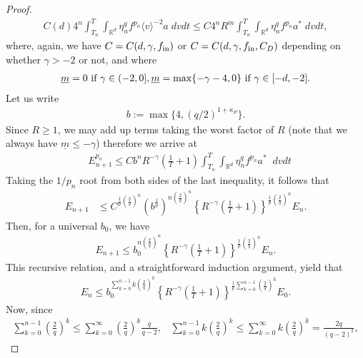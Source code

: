 \documentclass[12pt,american]{amsart}
\numberwithin{equation}{section}
\theoremstyle{plain}
\theoremstyle{definition}                  %
\def\astar{{a^*}}
\def\fin{f_{\textnormal{in}}}
\begin{document}
\begin{proof}
\begin{align*}
    C(d)4^n\int_{T_n}^T\int_{\mathbb{R}^d}\eta_n^q f^{p_n}\langle v\rangle^{-2}a\;dvdt \leq C4^n R^{\underline{m}} \int_{T_n}^T\int_{\mathbb{R}^d}\eta_n^q f^{p_n}\astar \;dvdt,
  \end{align*}
  where, again, we have $C=C(d,\gamma,\fin)$ or $C=C(d,\gamma,\fin,C_D)$ depending on whether $\gamma>-2$ or not, and where 
  \begin{align*}
    \underline{m} = 0 \textnormal{ if } \gamma\in (-2,0], \underline{m} = \max\{-\gamma-4,0\} \textnormal{ if } \gamma\in [-d,-2].	  
  \end{align*}	  
  Let us write
  \begin{align*}
    b := \max\{4,(q/2)^{1+\kappa_P}\}.
  \end{align*}	  
   Since $R\geq 1$, we may add up terms taking the worst factor of $R$ (note that we always have $\underline{m}\leq -\gamma$) therefore we arrive at
  \begin{align*}	
    & E_{n+1}^{p_{n}} \leq Cb^nR^{-\gamma }\left( \frac{1}{T}+1 \right)\int_{T_n}^{T}\int_{\mathbb{R}^d} \eta_n^q f^{p_n} \astar \;\;dvdt
  \end{align*}
  Taking the $1/p_n$ root from both sides of the last inequality, it follows that
  \begin{align*}
    E_{n+1} & \leq C^{\frac{1}{p}\left ( \frac{2}{q}\right)^n} \left ( b^{\frac{1}{p}} \right )^{n\left (\frac{2}{q} \right )^n}\left \{  R^{-\gamma}\left( \frac{1}{T}+1 \right) \right \}^{\frac{1}{p}\left (\frac{2}{q} \right)^n} E_{n}.
  \end{align*}
  Then, for a universal $b_0$, we have 
  \begin{align*}
    E_{n+1} \leq b_0^{n\left (\frac{2}{q}\right )^n}\left \{ R^{-\gamma}\left (\frac{1}{T}+1 \right ) \right \}^{\frac{1}{p}\left ( \frac{2}{q}\right )^n} E_n.
  \end{align*}
  This recursive relation, and a straightforward induction argument, yield that
  \begin{align*}
    E_{n} \leq b_0^{ \sum \limits_{k=0}^{n-1}k \left ( \frac{2}{q}\right )^k}\left \{  R^{-\gamma}\left ( \frac{1}{T}+1\right ) \right \}^{\frac{1}{p} \sum \limits_{k=0}^{n-1} \left (\frac{2}{q} \right )^k } E_0.
  \end{align*}
  Now, since
  \begin{align*}
    \sum \limits_{k=0}^{n-1}\left ( \frac{2}{q}\right )^k \leq \sum \limits_{k=0}^\infty  \left ( \frac{2}{q}\right )^k  \frac{q}{q-2},\;\;\; \sum \limits_{k=0}^{n-1}k \left ( \frac{2}{q}\right )^k \leq \sum \limits_{k=0}^\infty k \left ( \frac{2}{q}\right )^k = \frac{2q}{(q-2)^2},

\end{align*}
\end{proof}
\end{document}
